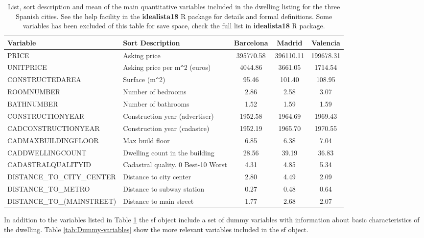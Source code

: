 \documentclass[Royal,times,sageh]{sagej}
\begin{document}
\begin{table}[ht]
\centering
\fontsize{8}{10}\selectfont
\begin{tabular}{>{\raggedright\arraybackslash}p{13em}>{\raggedright\arraybackslash}p{14em}ccc}
  \hline
Variable & Sort Description & Barcelona & Madrid & Valencia \\ 
  \hline
PRICE & Asking price & 395770.58 & 396110.11 & 199678.31 \\ 
  UNITPRICE & Asking price per m\verb|^|2 (euros) & 4044.86 & 3661.05 & 1714.54 \\ 
  CONSTRUCTEDAREA & Surface (m\verb|^|2) & 95.46 & 101.40 & 108.95 \\ 
  ROOMNUMBER & Number of bedrooms & 2.86 & 2.58 & 3.07 \\ 
  BATHNUMBER & Number of bathrooms & 1.52 & 1.59 & 1.59 \\ 
  CONSTRUCTIONYEAR & Construction year (advertiser) & 1952.58 & 1964.69 & 1969.43 \\ 
  CADCONSTRUCTIONYEAR & Construction year (cadastre) & 1952.19 & 1965.70 & 1970.55 \\ 
  CADMAXBUILDINGFLOOR & Max build floor & 6.85 & 6.38 & 7.04 \\ 
  CADDWELLINGCOUNT & Dwelling count in the building & 28.56 & 39.19 & 36.83 \\ 
  CADASTRALQUALITYID & Cadastral quality. 0 Best-10 Worst & 4.31 & 4.85 & 5.34 \\ 
  DISTANCE\_TO\_CITY\_CENTER & Distance to city center & 2.80 & 4.49 & 2.09 \\ 
  DISTANCE\_TO\_METRO & Distance to subway station & 0.27 & 0.48 & 0.64 \\ 
  DISTANCE\_TO\_(MAINSTREET) & Distance to main street & 1.77 & 2.68 & 2.07 \\ 
   \hline
\end{tabular}
\caption{List, sort description and mean of the main quantitative variables included in the dwelling listing for the three Spanish cities. See the help facility in the \textbf{idealista18} R package for details and formal definitions. Some variables has been excluded of this table for save space, check the full list in  \textbf{idealista18} R package. \label{tab:variables}} 
\end{table}

In addition to the variables listed in Table \ref{tab:variables} the sf
object include a set of dummy variables with information about basic
characteristics of the dwelling. Table \ref{tab:Dummy-variables} show
the more relevant variables included in the sf object.
\end{document}
